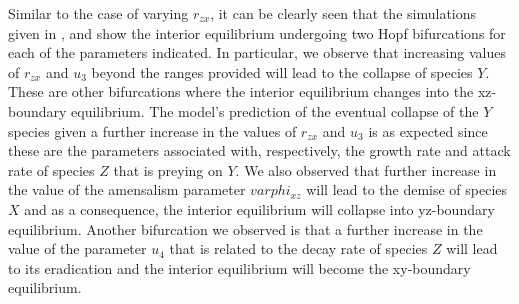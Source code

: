 Similar to the case of varying $r_{zx}$, it can be clearly seen that the simulations given in ,  and  show the interior equilibrium undergoing two Hopf bifurcations for each of the parameters indicated. In particular, we observe that increasing values of $r_{zx}$ and $u_3$ beyond the ranges provided will lead to the collapse of species $Y$. These are other bifurcations where the interior equilibrium changes into the xz-boundary equilibrium.  The model’s prediction of the eventual collapse of the $Y$ species given a further increase in the values of $r_{zx}$ and $u_3$ is as expected since these are the parameters associated with, respectively,  the growth rate and attack rate of species $Z$ that is preying on $Y$. We also observed that further increase in the value of the amensalism parameter $varphi_{xz}$ will lead to the demise of species $X$ and  as a consequence, the interior equilibrium will collapse into yz-boundary equilibrium. Another bifurcation we observed is that a further increase in the value of the parameter $u_4$ that is related to the decay rate of species $Z$ will lead to its eradication and the interior equilibrium will become the xy-boundary equilibrium. 
